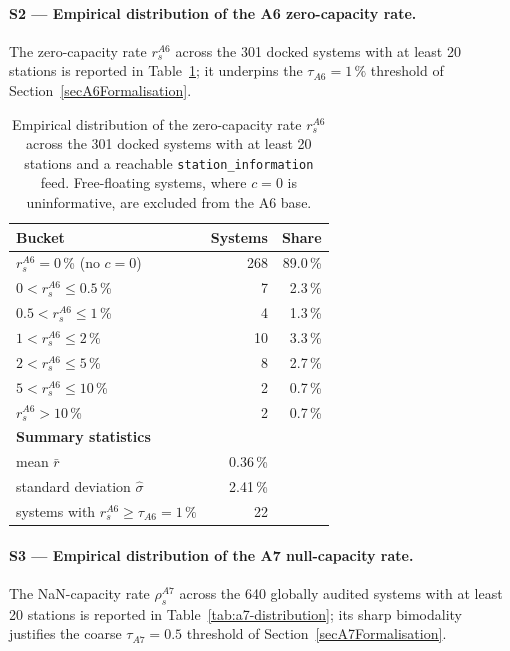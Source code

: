 \documentclass[11pt,a4paper]{article}
\begin{document}
\paragraph{S2 --- Empirical distribution of the A6 zero-capacity rate.}
The zero-capacity rate $r_s^{A6}$ across the 301 docked systems with
at least 20 stations is reported in Table~\ref{tab:a6-distribution};
it underpins the $\tau_{A6} = 1\,\%$ threshold of
Section~\ref{secA6Formalisation}.

\begin{table}[!htbp]
\centering
\caption{Empirical distribution of the zero-capacity rate
$r_s^{A6}$ across the 301 docked systems with at least 20 stations and
a reachable \texttt{station\_information} feed. Free-floating systems,
where $c = 0$ is uninformative, are excluded from the A6 base.}
\label{tab:a6-distribution}
\small
\begin{tabular}{@{}lrr@{}}
\toprule
\textbf{Bucket} & \textbf{Systems} & \textbf{Share}\\
\midrule
$r_s^{A6} = 0$\,\% (no $c = 0$)   & 268 & 89.0\,\% \\
$0 < r_s^{A6} \leq 0.5$\,\%        &   7 &  2.3\,\% \\
$0.5 < r_s^{A6} \leq 1$\,\%        &   4 &  1.3\,\% \\
$1 < r_s^{A6} \leq 2$\,\%          &  10 &  3.3\,\% \\
$2 < r_s^{A6} \leq 5$\,\%          &   8 &  2.7\,\% \\
$5 < r_s^{A6} \leq 10$\,\%         &   2 &  0.7\,\% \\
$r_s^{A6} > 10$\,\%                &   2 &  0.7\,\% \\
\midrule
\textbf{Summary statistics} & & \\
\quad mean $\bar r$                 &  0.36\,\% & \\
\quad standard deviation $\hat\sigma$ &  2.41\,\% & \\
\quad systems with $r_s^{A6} \geq \tau_{A6} = 1\,\%$ & 22 & \\
\bottomrule
\end{tabular}
\end{table}

\paragraph{S3 --- Empirical distribution of the A7 null-capacity rate.}
The NaN-capacity rate $\rho_s^{A7}$ across the 640 globally audited
systems with at least 20 stations is reported in
Table~\ref{tab:a7-distribution}; its sharp bimodality justifies the
coarse $\tau_{A7} = 0.5$ threshold of Section~\ref{secA7Formalisation}.
\end{document}
